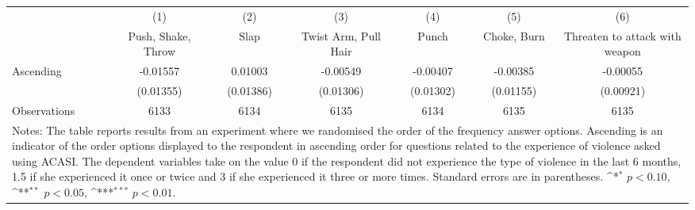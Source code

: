 {
\def\sym#1{\ifmmode^{#1}\else\(^{#1}\)\fi}
\begin{tabular*}{1.0\hsize}{@{\hskip\tabcolsep\extracolsep\fill}l*{6}{c}}
\hline\hline
                &\multicolumn{1}{c}{(1)}&\multicolumn{1}{c}{(2)}&\multicolumn{1}{c}{(3)}&\multicolumn{1}{c}{(4)}&\multicolumn{1}{c}{(5)}&\multicolumn{1}{c}{(6)}\\
                &\multicolumn{1}{c}{Push, Shake, Throw}&\multicolumn{1}{c}{Slap}&\multicolumn{1}{c}{Twist Arm, Pull Hair}&\multicolumn{1}{c}{Punch}&\multicolumn{1}{c}{Choke, Burn}&\multicolumn{1}{c}{Threaten to attack with weapon}\\
\hline
Ascending       & -0.01557         &  0.01003         & -0.00549         & -0.00407         & -0.00385         & -0.00055         \\
                &(0.01355)         &(0.01386)         &(0.01306)         &(0.01302)         &(0.01155)         &(0.00921)         \\
\hline
Observations    &     6133         &     6134         &     6135         &     6134         &     6135         &     6135         \\
\hline\hline
\multicolumn{7}{p{1.0\linewidth}}{\footnotesize Notes: The table reports results from an experiment where we randomised the order of the frequency answer options. Ascending is an indicator of the order options displayed to the respondent in ascending order for questions related to the experience of violence asked using ACASI. The dependent variables take on the value 0 if the respondent did not experience the type of violence in the last 6 months, 1.5 if she experienced it once or twice and 3 if she experienced it three or more times. Standard errors are in parentheses. \sym{*} \(p<0.10\), \sym{**} \(p<0.05\), \sym{***} \(p<0.01\).}\\
\end{tabular*}
}
